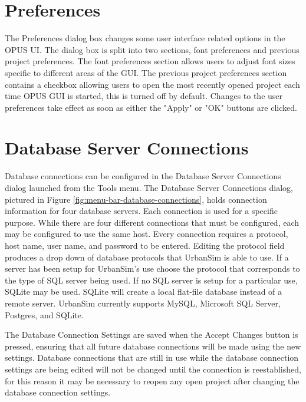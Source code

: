 \section{Preferences}

The Preferences dialog box changes some user interface related options in the OPUS UI.  The dialog box is split into two sections, font preferences and previous project preferences.  The font preferences section allows users to adjust font sizes specific to different areas of the GUI.  The previous project preferences section contains a checkbox allowing users to open the most recently opened project each time OPUS GUI is started, this is turned off by default.  Changes to the user preferences take effect as soon as either the "Apply" or "OK" buttons are clicked.

\section{Database Server Connections}\label{sec:database-server-connections}

Database connections can be configured in the Database Server Connections dialog launched from the Tools menu.  The Database Server Connections dialog, pictured in Figure \ref{fig:menu-bar-database-connections}, holds connection information for four database servers.  Each connection is used for a specific purpose.  While there are four different connections that must be configured, each may be configured to use the same host.  Every connection requires a protocol, host name, user name, and password to be entered.  Editing the protocol field produces a drop down of database protocols that UrbanSim is able to use.  If a server has been setup for UrbanSim's use choose the protocol that corresponds to the type of SQL server being used.  If no SQL server is setup for a particular use, SQLite may be used.  SQLite will create a local flat-file database instead of a remote server.  UrbanSim currently supports MySQL, Microsoft SQL Server, Postgres, and SQLite.

The Database Connection Settings are saved when the Accept Changes button is pressed, ensuring that all future database connections will be made using the new settings.  Database connections that are still in use while the database connection settings are being edited will not be changed until the connection is reestablished, for this reason it may be necessary to reopen any open project after changing the database connection settings.

